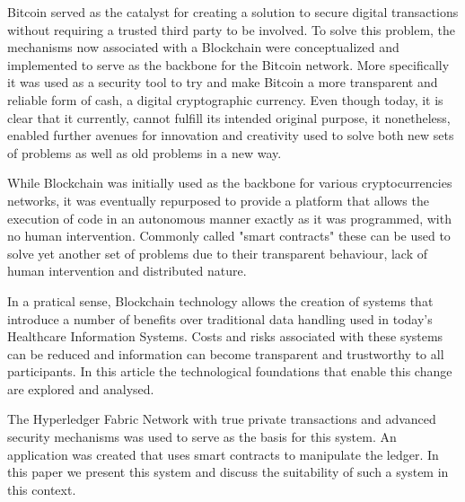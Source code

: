 \begin{tueABSTRACT}

  Bitcoin served as the catalyst for creating a solution to secure digital
  transactions without requiring a trusted third party to be involved. To solve
  this problem, the mechanisms now associated with a Blockchain were
  conceptualized and implemented to serve as the backbone for the Bitcoin
  network. More specifically it was used as a security tool to try and make
  Bitcoin a more transparent and reliable form of cash, a digital cryptographic
  currency.  Even though today, it is clear that it currently, cannot fulfill
  its intended original purpose, it nonetheless, enabled further avenues for
  innovation and creativity used to solve both new sets of problems as well as
  old problems in a new way.

  While Blockchain was initially used as the backbone for various
  cryptocurrencies networks, it was eventually repurposed to provide a platform
  that allows the execution of code in an autonomous manner exactly as it was
  programmed, with no human intervention. Commonly called "smart contracts"
  these can be used to solve yet another set of problems due to their
  transparent behaviour, lack of human intervention and distributed nature. 

  In a pratical sense, Blockchain technology allows the creation of systems
  that introduce a number of benefits over traditional data handling used in
  today's Healthcare Information Systems. Costs and risks associated with these
  systems can be reduced and information can become transparent and trustworthy
  to all participants. In this article the technological foundations that
  enable this change are explored and analysed. 
  
  The Hyperledger Fabric Network with true private transactions and advanced
  security mechanisms was used to serve as the basis for this system. An
  application was created that uses smart contracts to manipulate the ledger.
  In this paper we present this system and discuss the suitability of such a
  system in this context.

\end{tueABSTRACT}
